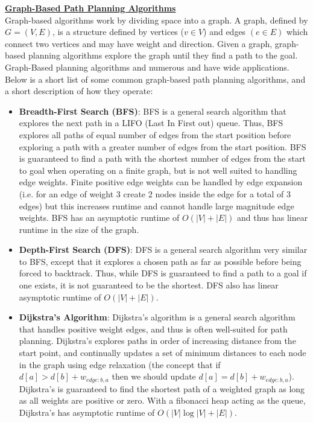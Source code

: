 \documentclass{article}
\begin{document}
\textbf{\underline{Graph-Based Path Planning Algorithms}}\\[1mm]
Graph-based algorithms work by dividing space into a graph. A graph, defined by $G=(V,E)$, is a structure defined by vertices ($v\in V$) and edges $(e\in E)$ which connect two vertices and may have weight and direction. Given a graph, graph-based planning algorithms explore the graph until they find a path to the goal. Graph-Based planning algorithms and numerous and have wide applications. Below is a short list of some common graph-based path planning algorithms, and a short description of how they operate: 
\begin{itemize}
    \item \textbf{Breadth-First Search (BFS)}: BFS is a general search algorithm that explores the next path in a LIFO (Last In First out) queue. Thus, BFS explores all paths of equal number of edges from the start position before exploring a path with a greater number of edges from the start position. BFS is guaranteed to find a path with the shortest number of edges from the start to goal when operating on a finite graph, but is not well suited to handling edge weights. Finite positive edge weights can be handled by edge expansion (i.e. for an edge of weight 3 create 2 nodes inside the edge for a total of 3 edges) but this increases runtime and cannot handle large magnitude edge weights. BFS has an asymptotic runtime of $O(|V|+|E|)$ and thus has linear runtime in the size of the graph. 
    \item \textbf{Depth-First Search (DFS)}: DFS is a general search algorithm very similar to BFS, except that it explores a chosen path as far as possible before being forced to backtrack. Thus, while DFS is guaranteed to find a path to a goal if one exists, it is not guaranteed to be the shortest. DFS also has linear asymptotic runtime of $O(|V|+|E|)$. 
    \item \textbf{Dijkstra's Algorithm}: Dijkstra's algorithm is a general search algorithm that handles positive weight edges, and thus is often well-suited for path planning. Dijkstra's explores paths in order of increasing distance from the start point, and continually updates a set of minimum distances to each node in the graph using edge relaxation (the concept that if $d[a]>d[b]+w_{edge:b,a}$ then we should update $d[a]=d[b]+w_{edge:b,a}$). Dijkstra's is guaranteed to find the shortest path of a weighted graph as long as all weights are positive or zero. With a fibonacci heap acting as the queue, Dijkstra's has asymptotic runtime of $O(|V|\log |V| + |E|)$. 

\end{itemize}
\end{document}
